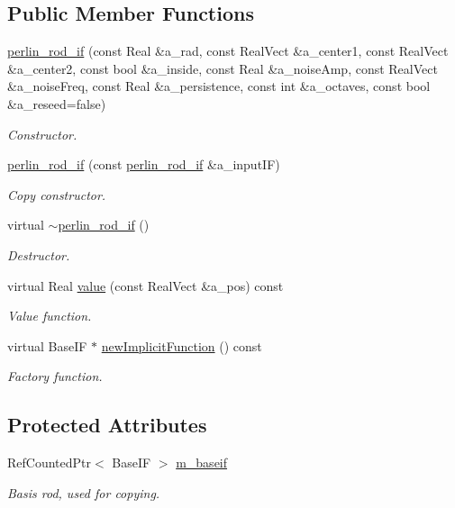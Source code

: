 \subsection*{Public Member Functions}
\begin{DoxyCompactItemize}
\item 
\hyperlink{classperlin__rod__if_a53601fd6ea117611759309d13c047d8f}{perlin\+\_\+rod\+\_\+if} (const Real \&a\+\_\+rad, const Real\+Vect \&a\+\_\+center1, const Real\+Vect \&a\+\_\+center2, const bool \&a\+\_\+inside, const Real \&a\+\_\+noise\+Amp, const Real\+Vect \&a\+\_\+noise\+Freq, const Real \&a\+\_\+persistence, const int \&a\+\_\+octaves, const bool \&a\+\_\+reseed=false)
\begin{DoxyCompactList}\small\item\em Constructor. \end{DoxyCompactList}\item 
\hyperlink{classperlin__rod__if_a4b899d619585e05ca2d22ad381a612c8}{perlin\+\_\+rod\+\_\+if} (const \hyperlink{classperlin__rod__if}{perlin\+\_\+rod\+\_\+if} \&a\+\_\+input\+IF)
\begin{DoxyCompactList}\small\item\em Copy constructor. \end{DoxyCompactList}\item 
virtual \hyperlink{classperlin__rod__if_a878bfbbb0c4719eda1dc3d9b8ef67e3e}{$\sim$perlin\+\_\+rod\+\_\+if} ()
\begin{DoxyCompactList}\small\item\em Destructor. \end{DoxyCompactList}\item 
virtual Real \hyperlink{classperlin__rod__if_a9e41b07a1ddf74cd0e5cbb19c5d9199a}{value} (const Real\+Vect \&a\+\_\+pos) const 
\begin{DoxyCompactList}\small\item\em Value function. \end{DoxyCompactList}\item 
virtual Base\+IF $\ast$ \hyperlink{classperlin__rod__if_a3466999526f84e6ce652f326bc8bd5de}{new\+Implicit\+Function} () const 
\begin{DoxyCompactList}\small\item\em Factory function. \end{DoxyCompactList}\end{DoxyCompactItemize}
\subsection*{Protected Attributes}
\begin{DoxyCompactItemize}
\item 
Ref\+Counted\+Ptr$<$ Base\+IF $>$ \hyperlink{classperlin__rod__if_a7beef630675e687ed71d64b57f947f92}{m\+\_\+baseif}
\begin{DoxyCompactList}\small\item\em Basis rod, used for copying. \end{DoxyCompactList}\end{DoxyCompactItemize}


